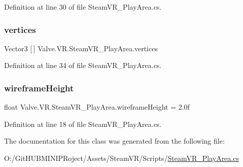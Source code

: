 Definition at line 30 of file Steam\+V\+R\+\_\+\+Play\+Area.\+cs.

\mbox{\label{class_valve_1_1_v_r_1_1_steam_v_r___play_area_ac864c9b919423e19e47840a9db0b663a}} 
\subsubsection{\texorpdfstring{vertices}{vertices}}
{\footnotesize\ttfamily Vector3 \mbox{[}$\,$\mbox{]} Valve.\+V\+R.\+Steam\+V\+R\+\_\+\+Play\+Area.\+vertices}



Definition at line 34 of file Steam\+V\+R\+\_\+\+Play\+Area.\+cs.

\mbox{\label{class_valve_1_1_v_r_1_1_steam_v_r___play_area_acd342cca6da262141cbbd1b93e1150e4}} 
\subsubsection{\texorpdfstring{wireframeHeight}{wireframeHeight}}
{\footnotesize\ttfamily float Valve.\+V\+R.\+Steam\+V\+R\+\_\+\+Play\+Area.\+wireframe\+Height = 2.\+0f}



Definition at line 18 of file Steam\+V\+R\+\_\+\+Play\+Area.\+cs.



The documentation for this class was generated from the following file\+:\begin{DoxyCompactItemize}
\item 
O\+:/\+Git\+H\+U\+B\+M\+I\+N\+I\+P\+Roject/\+Assets/\+Steam\+V\+R/\+Scripts/\mbox{\hyperlink{_steam_v_r___play_area_8cs}{Steam\+V\+R\+\_\+\+Play\+Area.\+cs}}\end{DoxyCompactItemize}
